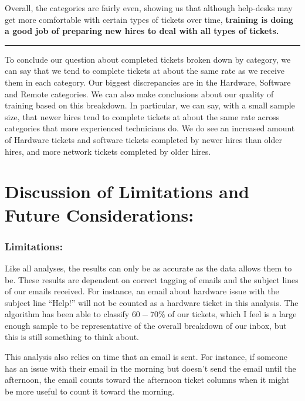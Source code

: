 \documentclass[11pt]{article}
\begin{document}
Overall, the categories are fairly even, showing us that although
help-desks may get more comfortable with certain types of tickets over
time, \textbf{training is doing a good job of preparing new hires to
deal with all types of tickets.}

\begin{center}\rule{0.5\linewidth}{\linethickness}\end{center}

To conclude our question about completed tickets broken down by
category, we can say that we tend to complete tickets at about the same
rate as we receive them in each category. Our biggest discrepancies are
in the Hardware, Software and Remote categories. We can also make
conclusions about our quality of training based on this breakdown. In
particular, we can say, with a small sample size, that newer hires tend
to complete tickets at about the same rate across categories that more
experienced technicians do. We do see an increased amount of Hardware
tickets and software tickets completed by newer hires than older hires,
and more network tickets completed by older hires.


 \hypertarget{discussion-of-limitations-and-future-considerations}{%
\section{Discussion of Limitations and Future
Considerations:}\label{discussion-of-limitations-and-future-considerations}}

 \hypertarget{limitations}{%
\subsubsection{Limitations:}\label{limitations}}

Like all analyses, the results can only be as accurate as the data
allows them to be. These results are dependent on correct tagging of
emails and the subject lines of our emails received. For instance, an
email about hardware issue with the subject line ``Help!'' will not be
counted as a hardware ticket in this analysis. The algorithm has been
able to classify \(60-70\%\) of our tickets, which I feel is a large
enough sample to be representative of the overall breakdown of our
inbox, but this is still something to think about.

This analysis also relies on time that an email is sent. For instance,
if someone has an issue with their email in the morning but doesn't send
the email until the afternoon, the email counts toward the afternoon
ticket columns when it might be more useful to count it toward the
morning.
\end{document}
